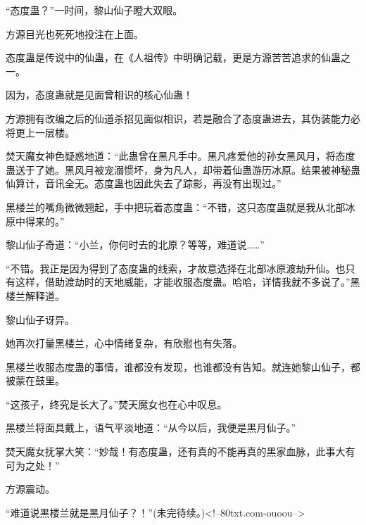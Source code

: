 \begin{this_body}
“态度蛊？”一时间，黎山仙子瞪大双眼。

方源目光也死死地投注在上面。

态度蛊是传说中的仙蛊，在《人祖传》中明确记载，更是方源苦苦追求的仙蛊之一。

因为，态度蛊就是见面曾相识的核心仙蛊！

方源拥有改编之后的仙道杀招见面似相识，若是融合了态度蛊进去，其伪装能力必将更上一层楼。

焚天魔女神色疑惑地道：“此蛊曾在黑凡手中。黑凡疼爱他的孙女黑风月，将态度蛊送于了她。黑风月被宠溺惯坏，身为凡人，却带着仙蛊游历冰原。结果被神秘蛊仙算计，音讯全无。态度蛊也因此失去了踪影，再没有出现过。”

黑楼兰的嘴角微微翘起，手中把玩着态度蛊：“不错，这只态度蛊就是我从北部冰原中得来的。”

黎山仙子奇道：“小兰，你何时去的北原？等等，难道说……”

“不错。我正是因为得到了态度蛊的线索，才故意选择在北部冰原渡劫升仙。也只有这样，借助渡劫时的天地威能，才能收服态度蛊。哈哈，详情我就不多说了。”黑楼兰解释道。

黎山仙子讶异。

她再次打量黑楼兰，心中情绪复杂，有欣慰也有失落。

黑楼兰收服态度蛊的事情，谁都没有发现，也谁都没有告知。就连她黎山仙子，都被蒙在鼓里。

“这孩子，终究是长大了。”焚天魔女也在心中叹息。

黑楼兰将面具戴上，语气平淡地道：“从今以后，我便是黑月仙子。”

焚天魔女抚掌大笑：“妙哉！有态度蛊，还有真的不能再真的黑家血脉，此事大有可为之处！”

方源震动。

“难道说黑楼兰就是黑月仙子？！”(未完待续。)<!--80txt.com-ouoou-->

\end{this_body}

